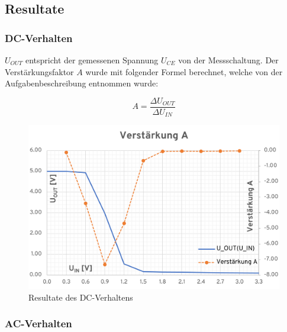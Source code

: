\documentclass[../main.tex]{subfiles}
\begin{document}
\newpage

\subsection{Resultate}

\subsubsection{DC-Verhalten}

$U_{OUT}$ entspricht der gemessenen Spannung $U_{CE}$ von der Messschaltung. Der Verstärkungsfaktor $A$ wurde mit folgender Formel berechnet, welche von der Aufgabenbeschreibung entnommen wurde:

\begin{equation}
    A = \frac{\Delta U_{OUT}}{\Delta U_{IN}} 
\end{equation}

\begin{figure}[h]
    \centering
    \includegraphics{assets/task3_square/DC_Verhalten Werte.png}
    \caption{Resultate des DC-Verhaltens}
    \label{fig:result_dc_behaviour}
\end{figure}

\subsubsection{AC-Verhalten}
\end{document}
